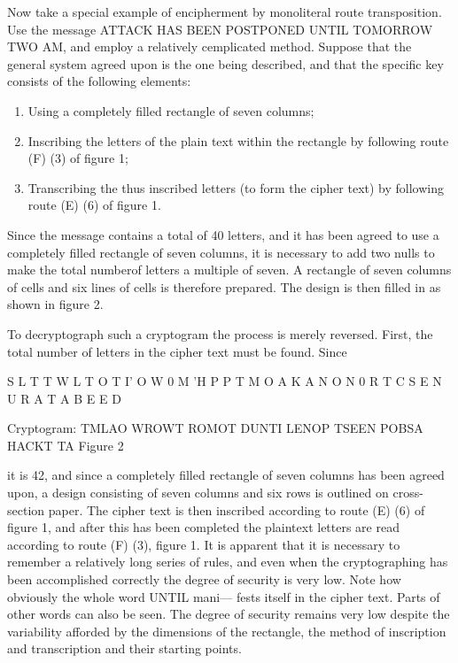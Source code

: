 \mypara Now take a special example of encipherment by monoliteral route
transposition. Use the message ATTACK HAS BEEN POSTPONED
UNTIL TOMORROW TWO AM, and employ a relatively cemplicated
method. Suppose that the general system agreed upon is the one being
described, and that the specific key consists of the following elements:

\begin{enumerate}
\item Using a completely filled rectangle of seven columns;

\item Inscribing the letters of the plain text within the rectangle by
following route (F) (3) of figure 1;

\item Transcribing the thus inscribed letters (to form the cipher text)
by following route (E) (6) of figure 1.
\end{enumerate}

Since the message contains a total of 40 letters, and it has been
agreed to use a completely filled rectangle of seven columns, it is
necessary to add two nulls to make the total numberof letters a
multiple of seven. A rectangle of seven columns of cells and six
lines of cells is therefore prepared. The design is then filled in as
shown in figure 2.

\mypara To decryptograph such a cryptogram the process is merely reversed.
First, the total number of letters in the cipher text must be found. Since

S L T T W L T
O T I' O W 0 M
'H P P T M O A
K A N O N 0 R
T C S E N U R
A T A B E E D

 

Cryptogram:
TMLAO WROWT ROMOT DUNTI LENOP
TSEEN POBSA HACKT TA
Figure 2


it is 42, and since a completely filled rectangle of seven columns has been
agreed upon, a design consisting of seven columns and six rows is outlined on cross-section paper. The cipher text is then inscribed according
to route (E) (6) of figure 1, and after this has been completed the plaintext letters are read according to route (F) (3), figure 1. It is apparent
that it is necessary to remember a relatively long series of rules, and even
when the cryptographing has been accomplished correctly the degree of
security is very low. Note how obviously the whole word UNTIL mani—
fests itself in the cipher text. Parts of other words can also be seen.
The degree of security remains very low despite the variability afforded
by the dimensions of the rectangle, the method of inscription and transcription and their starting points.

